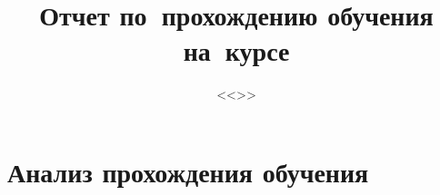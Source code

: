 \documentclass[12pt]{report}
\title{Отчет по~прохождению обучения на~курсе}
\subtitle{<<\coursetitle>>}
\begin{document}
\maketitle
\tableofcontents



\chapter{Анализ прохождения обучения}

\end{document}
